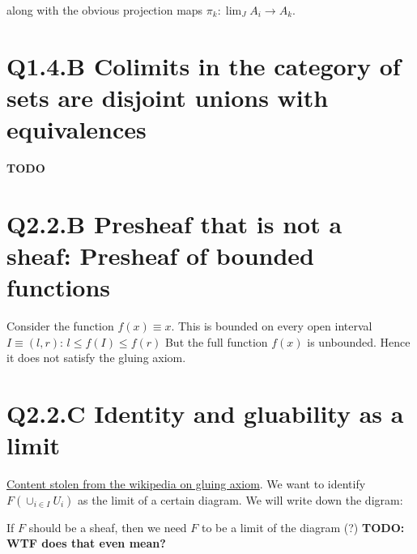 \documentclass{book}
\theoremstyle{definition}
\begin{document}
along with the obvious projection maps $\pi_k: \lim_J A_i \rightarrow A_k$.

\section{Q1.4.B  Colimits in the category of sets are disjoint unions with equivalences}
\textbf{TODO}


\section{Q2.2.B  Presheaf that is not a sheaf: Presheaf of bounded functions}

Consider the function $f(x) \equiv x$. This is bounded on every open interval
$I \equiv (l, r)$: $l \leq f(I) \leq f(r)$ But the full function $f(x)$ is unbounded.
Hence it does not satisfy the gluing axiom.


\section{Q2.2.C  Identity and gluability as a limit}


\href{https://en.wikipedia.org/wiki/Gluing_axiom}{Content stolen from the wikipedia on gluing axiom}.
We want to identify $F(\cup_{i \in I} U_i)$ as the limit of a certain diagram.
We will write down the digram:


If $F$ should be a sheaf, then we need $F$ to be a limit of the diagram (?)
\textbf{TODO: WTF does that even mean?}
\end{document}
